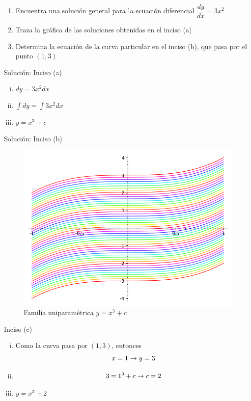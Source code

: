 \begin{enumerate}
	\item  Encuentra una solución general para la ecuación diferencial $\dfrac{dy}{dx}=3x^{2}$
	\item Traza la gráfica de las soluciones obtenidas en el inciso (a)
	\item Determina la ecuación de la curva particular en el inciso (b), que pasa por el punto $\left( 1,3 \right)$
\end{enumerate}


{Solución: Inciso (a)}
\begin{enumerate}[(i)]
	\item $dy=3x^{2}dx$
	\item $\displaystyle
	\int dy = \int 3x^{2}dx$

	\item $y=x^{3}+c$
\end{enumerate}


{Solución: Inciso (b)}
\begin{figure}
	\centering
	\includegraphics[height=.6\textheight,keepaspectratio=true]{./edo/solved_problem_02-08.png}
	\caption{Familia uniparamétrica $y=x^3+c$}
	\label{fig:solved_problem_02-08}
\end{figure}



{Inciso (c)}
\begin{enumerate}[(i)]
	\item Como la curva pasa por $(1,3)$, entonces
	$$x=1 \rightarrow y =3$$
	\item $$
	3 = 1^{3}+c \rightarrow c=2
	$$
	\item $y=x^{3}+2$
\end{enumerate}



